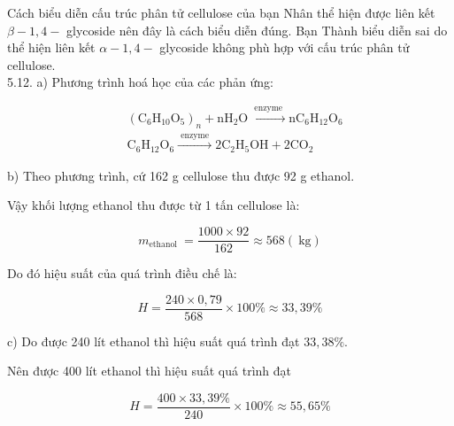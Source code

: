 \documentclass[10pt]{article}
\begin{document}
Cách biểu diễn cấu trúc phân tử cellulose của bạn Nhân thể hiện được liên kết $\beta-1,4-$ glycoside nên đây là cách biểu diễn đúng. Bạn Thành biểu diễn sai do thể hiện liên kết $\alpha-1,4-$ glycoside không phù hợp với cấu trúc phân tử cellulose.\\
5.12. a) Phương trình hoá học của các phản ứng:

$$
\begin{aligned}
& \left(\mathrm{C}_{6} \mathrm{H}_{10} \mathrm{O}_{5}\right)_{n}+\mathrm{nH}_{2} \mathrm{O} \xrightarrow{\text { enzyme }} \mathrm{nC}_{6} \mathrm{H}_{12} \mathrm{O}_{6} \\
& \mathrm{C}_{6} \mathrm{H}_{12} \mathrm{O}_{6} \xrightarrow{\text { enzyme }} 2 \mathrm{C}_{2} \mathrm{H}_{5} \mathrm{OH}+2 \mathrm{CO}_{2}
\end{aligned}
$$

b) Theo phương trình, cứ 162 g cellulose thu được 92 g ethanol.

Vậy khối lượng ethanol thu được từ 1 tấn cellulose là:

$$
m_{\text {ethanol }}=\frac{1000 \times 92}{162} \approx 568(\mathrm{~kg})
$$

Do đó hiệu suất của quá trình điều chế là:

$$
H=\frac{240 \times 0,79}{568} \times 100 \% \approx 33,39 \%
$$

c) Do được 240 lít ethanol thì hiệu suất quá trình đạt $33,38 \%$.

Nên được 400 lít ethanol thì hiệu suất quá trình đạt

$$
H=\frac{400 \times 33,39 \%}{240} \times 100 \% \approx 55,65 \%
$$
\end{document}
